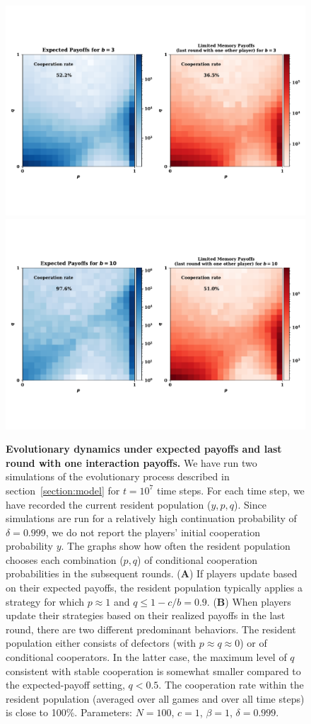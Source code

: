 \documentclass[11pt]{article}
\theoremstyle{plainCl1}
\theoremstyle{plainCl2}
\begin{document}
\begin{figure}[!htbp]
    \centering
    \includegraphics[width=.70\textwidth]{static/expected_and_stochastic_for_donation_game.pdf}\vspace{-3cm}
    \includegraphics[width=.70\textwidth]{static/expected_and_stochastic_for_donation_game_b_10.pdf}
    \caption{{\bf Evolutionary dynamics under expected payoffs and last round with one interaction payoffs.} 
    We have run two simulations of the evolutionary process described in
    section~\ref{section:model} for $t\!=\!10^7$ time steps. For each time step,
    we have recorded the current resident population ($y,p,q$). Since simulations
    are run for a relatively high continuation probability of $\delta\!=\!0.999$, we
    do not report the players' initial cooperation probability $y$. The graphs show
    how often the resident population chooses each combination ($p,q$) of
    conditional cooperation probabilities in the subsequent rounds. ({\bf A}) If
    players update based on their expected payoffs, the resident population
    typically applies a strategy for which $p\!\approx\!1$ and
    $q\!\le\!1\!-\!c/b\!=\!0.9$. ({\bf B})
    When players update their strategies based on their realized payoffs in the last
    round, there are two different predominant behaviors. The resident population
    either consists of defectors (with $p\!\approx\!q\!\approx\!0$) or of
    conditional cooperators. In the latter case, the maximum level of $q$ consistent
    with stable cooperation is somewhat smaller compared to the expected-payoff
    setting, $q\!<\!0.5$. The cooperation rate within the resident population
    (averaged over all games and over all time steps) is close to 100\%. Parameters:
    $N\!=\!100$, $c\!=\!1$, $\beta\!=\!1$, $\delta\!=\!0.999$.}
    \label{fig:expected_and_stochastic_for_donation}
\end{figure}
\end{document}
